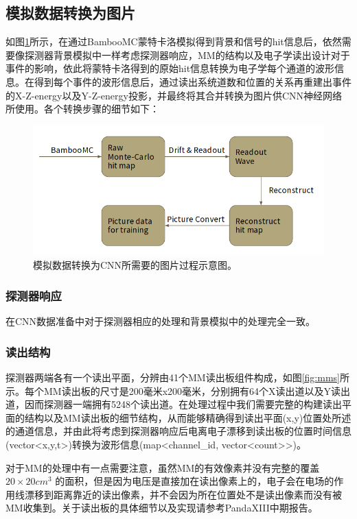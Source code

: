 \subsection{模拟数据转换为图片}

如图\ref{fig:process}所示，在通过BambooMC蒙特卡洛模拟得到背景和信号的hit信息后，依然需要像探测器背景模拟中一样考虑探测器响应，MM的结构以及电子学读出设计对于事件的影响，依此将蒙特卡洛得到的原始hit信息转换为电子学每个通道的波形信息。在得到每个事件的波形信息后，通过读出系统道数和位置的关系再重建出事件的X-Z-energy以及Y-Z-energy投影，并最终将其合并转换为图片供CNN神经网络所使用。各个转换步骤的细节如下：

\begin{figure}
    \centering
    \includegraphics[width=0.6\columnwidth]{pic/process.png}
    \caption{模拟数据转换为CNN所需要的图片过程示意图。}
    \label{fig:process}
\end{figure}

\subsubsection{探测器响应}
    在CNN数据准备中对于探测器相应的处理和背景模拟中的处理完全一致。

\subsubsection{读出结构}
    探测器两端各有一个读出平面，分辨由41个MM读出板组件构成，如图\ref{fig:mms}所示。每个MM读出板的尺寸是200毫米x200毫米，分别拥有64个X读出道以及Y读出道，因而探测器一端拥有5248个读出道。在处理过程中我们需要完整的构建读出平面的结构以及MM读出板的细节结构，从而能够精确得到读出平面(x,y)位置处所述的通道信息，并由此将考虑到探测器响应后电离电子漂移到读出板的位置时间信息(vector<x,y,t>)转换为波形信息(map<channel\_id, vector<count>>)。

    对于MM的处理中有一点需要注意，虽然MM的有效像素并没有完整的覆盖$20\times20cm^3$
    的面积，但是因为电压是直接加在读出像素上的，电子会在电场的作用线漂移到距离靠近的读出像素，并不会因为所在位置处不是读出像素而没有被MM收集到。关于读出板的具体细节以及实现请参考PandaXIII中期报告\supercite{cdr}。

